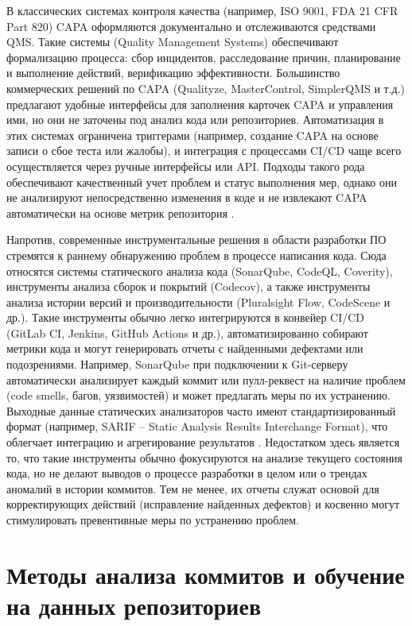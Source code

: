 В классических системах контроля качества (например, ISO 9001, FDA 21 CFR Part 820) CAPA оформляются документально и отслеживаются средствами QMS. Такие системы (Quality Management Systems) обеспечивают формализацию процесса: сбор инцидентов, расследование причин, планирование и выполнение действий, верификацию эффективности. Большинство коммерческих решений по CAPA (Qualityze, MasterControl, SimplerQMS и т.д.) предлагают удобные интерфейсы для заполнения карточек CAPA и управления ими, но они не заточены под анализ кода или репозиториев. Автоматизация в этих системах ограничена триггерами (например, создание CAPA на основе записи о сбое теста или жалобы), и интеграция с процессами CI/CD чаще всего осуществляется через ручные интерфейсы или API. Подходы такого рода обеспечивают качественный учет проблем и статус выполнения мер, однако они не анализируют непосредственно изменения в коде и не извлекают CAPA автоматически на основе метрик репозитория \cite{FDA}.

Напротив, современные инструментальные решения в области разработки ПО стремятся к раннему обнаружению проблем в процессе написания кода. Сюда относятся системы статического анализа кода (SonarQube, CodeQL, Coverity), инструменты анализа сборок и покрытий (Codecov), а также инструменты анализа истории версий и производительности (Pluralsight Flow, CodeScene и др.). Такие инструменты обычно легко интегрируются в конвейер CI/CD (GitLab CI, Jenkins, GitHub Actions и др.), автоматизированно собирают метрики кода и могут генерировать отчеты с найденными дефектами или подозрениями. Например, SonarQube при подключении к Git-серверу автоматически анализирует каждый коммит или пулл-реквест на наличие проблем (code smells, багов, уязвимостей) и может предлагать меры по их устранению. Выходные данные статических анализаторов часто имеют стандартизированный формат (например, SARIF – Static Analysis Results Interchange Format), что облегчает интеграцию и агрегирование результатов \cite{FDA}. Недостатком здесь является то, что такие инструменты обычно фокусируются на анализе текущего состояния кода, но не делают выводов о процессе разработки в целом или о трендах аномалий в истории коммитов. Тем не менее, их отчеты служат основой для корректирующих действий (исправление найденных дефектов) и косвенно могут стимулировать превентивные меры по устранению проблем.

\section{Методы анализа коммитов и обучение на данных репозиториев} \label{ch1:sec3}
